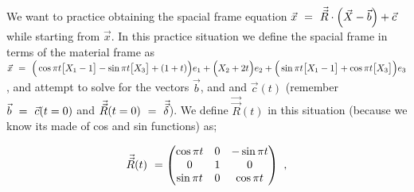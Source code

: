\documentclass{article}
\begin{document}
We want to practice obtaining the spacial frame equation \begin{math} \vec{x} \hspace{0.125cm} = \hspace{0.125cm} \vec{\vec{R}} \cdot \Big( \vec{X} - \vec{b} \Big) + \vec{c} \end{math} while starting from \begin{math} \vec{x} \end{math}. In this practice situation we define the spacial frame in terms of the material frame as \begin{math} \vec{x} \hspace{0.125cm} = \hspace{0.125cm}  \Big( \cos \pi t  \big[ X_1 - 1 \big] - \sin \pi t \big[ X_3 \big] + (1 + t) \Big) e_1 +  \Big( X_2 + 2 t \Big) e_2 + \Big( \sin \pi t \big[ X_1 - 1 \big] + \cos \pi t \big[ X_3 \big] \Big) e_3 \end{math}, and attempt to solve for the vectors \begin{math} \vec{b} \end{math}, and and \begin{math} \vec{c}( t ) \end{math} (remember \begin{math} \vec{b} \hspace{0.125cm} = \hspace{0.125cm} \vec{c}( t = 0 ) \end{math} and \begin{math} \vec{\vec{R}}( t = 0 ) \hspace{0.125cm} = \hspace{0.125cm} \vec{\vec{\delta}} \end{math}). We define \begin{math} \vec{\vec{R}}( t ) \end{math} in this situation (because we know its made of cos and sin functions) as;

\begin{equation} \label{eq:1}
\vec{\vec{R}}( t ) \hspace{0.125cm} = \begin{pmatrix} \cos \pi t & 0 & - \sin \pi t \\ 0 & 1 & 0 \\ \sin \pi t & 0 & \cos \pi t \end{pmatrix} \hspace{0.125cm} ,
\end{equation} 
\end{document}

